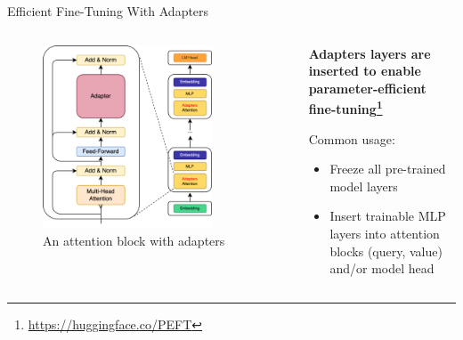 \documentclass[11pt,aspectratio=169]{beamer}
\begin{document}
\begin{frame}{Efficient Fine-Tuning With Adapters~\cite{houlsby2019parameterefficienttransferlearningnlp}}
    \begin{columns}
        \begin{column}{0.5\linewidth}
            \vspace{-0.2cm}
            \begin{figure}
                \centering
                \includegraphics[width=0.8\textwidth]{llama-adapter-simple.png}
                \caption{\centering An attention block with adapters}
            \end{figure}
        \end{column}
        \begin{column}{0.5\linewidth}
            \vspace{-0.2cm}
            \begin{center}
            \textbf{Adapters layers are inserted to enable parameter-efficient fine-tuning\footnote{\scriptsize\url{https://huggingface.co/PEFT}}}
            \end{center}
            Common usage:
            \begin{itemize}
                \item Freeze all pre-trained model layers
                \item Insert trainable MLP layers into attention blocks (query, value) and/or model head

\end{itemize}
\end{column}
\end{columns}
\end{frame}
\end{document}
